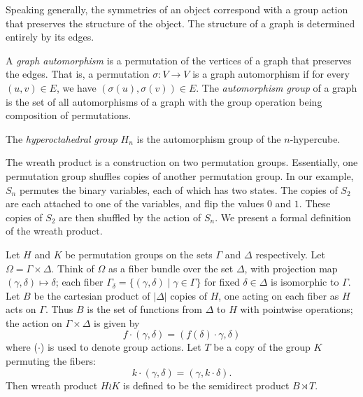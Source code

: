 \documentclass[cclicense]{hmcthesis}
\numberwithin{equation}{chapter}
\numberwithin{thmcounter}{chapter}
\begin{document}
    Speaking generally, the symmetries of an object correspond with a group
    action that preserves the structure of the object.  The structure of a graph
    is determined entirely by its edges.
    \begin{definition}
        A \emph{graph automorphism} is a permutation of the vertices of a graph
        that preserves the edges.  That is, a permutation $\sigma: V \to V$ is a
        graph automorphism if for every $(u, v) \in E$, we have $(\sigma(u),
        \sigma(v)) \in E$.
        The \emph{automorphism group} of a graph is the set of all
        automorphisms of a graph with the group operation being composition of
        permutations.
    \end{definition}

    \begin{definition}
        The \emph{hyperoctahedral group} $H_n$ is the automorphism group of the
        $n$-hypercube.
    \end{definition}

    The wreath product is a construction on two permutation groups.
    Essentially, one permutation group shuffles copies of another permutation
    group.  In our example, $S_n$ permutes the binary variables, each of which
    has two states.  The copies of $S_2$ are each attached to one of the
    variables, and flip the values $0$ and $1$.  These copies of $S_2$ are then
    shuffled by the action of $S_n$.  We present a formal definition of the
    wreath product.
    \begin{definition}
        Let $H$ and $K$ be permutation groups on the sets $\Gamma$ and $\Delta$
        respectively.  Let $\Omega = \Gamma \times \Delta$.  Think of $\Omega$
        as a fiber bundle over the set $\Delta$, with projection map $(\gamma,
        \delta) \mapsto \delta$; each fiber \mbox{$\Gamma_\delta = \{(\gamma, \delta)
        \mid \gamma \in \Gamma\}$} for fixed $\delta \in \Delta$ is isomorphic to
        $\Gamma$.  Let $B$ be the cartesian product of $|\Delta|$ copies of $H$,
        one acting on each fiber as $H$ acts on $\Gamma$.  Thus $B$ is the set
        of functions from $\Delta$ to $H$ with pointwise operations; the action
        on $\Gamma \times \Delta$ is given by
        \[
            f\cdot(\gamma, \delta) = (f(\delta) \cdot \gamma, \delta)
        \]
        where ($\cdot$) is used to denote group actions.  Let $T$ be a copy of
        the group $K$ permuting the fibers:
        \[
            k \cdot (\gamma, \delta) = (\gamma, k \cdot \delta).
        \]
        Then wreath product $H \wr K$ is defined to be the semidirect product $B
        \rtimes T$.
    \end{definition}
\end{document}
